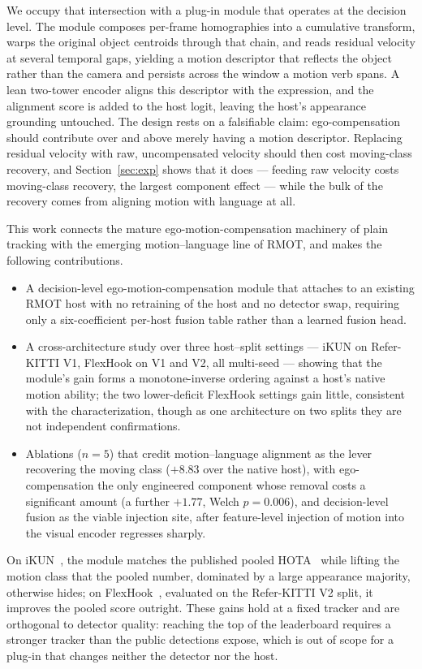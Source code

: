 \documentclass[sigconf,review,anonymous]{acmart}
\begin{document}
We occupy that intersection with a plug-in module that operates at the decision level. The module composes per-frame homographies into a cumulative transform, warps the original object centroids through that chain, and reads residual velocity at several temporal gaps, yielding a motion descriptor that reflects the object rather than the camera and persists across the window a motion verb spans. A lean two-tower encoder aligns this descriptor with the expression, and the alignment score is added to the host logit, leaving the host's appearance grounding untouched. The design rests on a falsifiable claim: ego-compensation should contribute over and above merely having a motion descriptor. Replacing residual velocity with raw, uncompensated velocity should then cost moving-class recovery, and Section~\ref{sec:exp} shows that it does --- feeding raw velocity costs moving-class recovery, the largest component effect --- while the bulk of the recovery comes from aligning motion with language at all.

This work connects the mature ego-motion-compensation machinery of plain tracking with the emerging motion--language line of RMOT, and makes the following contributions.
\begin{itemize}
  \item A decision-level ego-motion-compensation module that attaches to an existing RMOT host with no retraining of the host and no detector swap, requiring only a six-coefficient per-host fusion table rather than a learned fusion head.
  \item A cross-architecture study over three host--split settings --- iKUN on Refer-KITTI V1, FlexHook on V1 and V2, all multi-seed --- showing that the module's gain forms a monotone-inverse ordering against a host's native motion ability; the two lower-deficit FlexHook settings gain little, consistent with the characterization, though as one architecture on two splits they are not independent confirmations.
  \item Ablations ($n{=}5$) that credit motion--language alignment as the lever recovering the moving class ($+8.83$ over the native host), with ego-compensation the only engineered component whose removal costs a significant amount (a further $+1.77$, Welch $p{=}0.006$), and decision-level fusion as the viable injection site, after feature-level injection of motion into the visual encoder regresses sharply.
\end{itemize}

On iKUN~\cite{ikun}, the module matches the published pooled HOTA~\cite{hota} while lifting the motion class that the pooled number, dominated by a large appearance majority, otherwise hides; on FlexHook~\cite{flexhook}, evaluated on the Refer-KITTI V2 split, it improves the pooled score outright. These gains hold at a fixed tracker and are orthogonal to detector quality: reaching the top of the leaderboard requires a stronger tracker than the public detections expose, which is out of scope for a plug-in that changes neither the detector nor the host.
\end{document}
